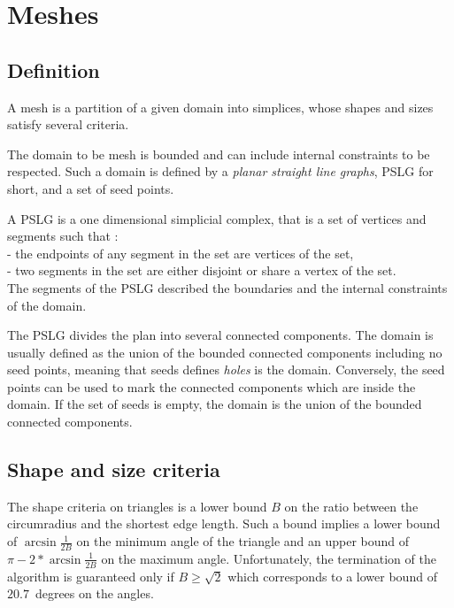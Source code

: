 
\section{Meshes}
\label{sec:Mesh_2_meshes}


\subsection{Definition}
\label{sec:Mesh_2_meshes_definition}

A mesh is a partition of a given domain into simplices, whose shapes
and sizes satisfy several criteria.

The domain to be mesh is bounded and can include internal constraints
to be respected.  Such a domain is defined by a \emph{planar straight
  line graphs}, PSLG for short, and a set of seed points.

A PSLG is a one dimensional simplicial complex, that
is a set of vertices and segments such that : \\
- the endpoints of any segment in the set are vertices of the set, \\
- two segments in the set are either disjoint or share a vertex of the 
set. \\
The segments of the PSLG described the boundaries and the internal
constraints of the domain.

The PSLG divides the plan into several connected components.  The domain is
usually defined as the union of the bounded connected components including
no seed points, meaning that seeds defines \emph{holes} is the domain.
Conversely, the seed points can be used to mark the connected components
which are inside the domain.  If the set of seeds is empty,
the domain is the union of the bounded connected components.

\subsection{Shape and size criteria}
\label{sec:Mesh_2_criteria}

The shape criteria on triangles is a lower bound $B$ on the ratio
between the circumradius and the shortest edge length.  Such a bound
implies a lower bound of $\arcsin{\frac{1}{2B}}$ on the minimum angle
of the triangle and an upper bound of $\pi - 2* \arcsin{\frac{1}{2B}}$
on the maximum angle.  Unfortunately, the termination of the algorithm
is guaranteed only if $B \ge \sqrt{2}$ which corresponds to a lower
bound of $20.7$~degrees on the angles.

